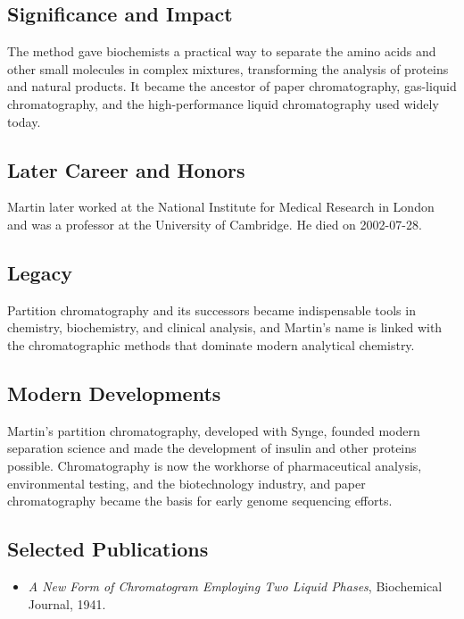 \subsection*{Significance and Impact}

The method gave biochemists a practical way to separate the amino acids and other small molecules in complex mixtures, transforming the analysis of proteins and natural products. It became the ancestor of paper chromatography, gas-liquid chromatography, and the high-performance liquid chromatography used widely today.

\subsection*{Later Career and Honors}

Martin later worked at the National Institute for Medical Research in London and was a professor at the University of Cambridge. He died on 2002-07-28.

\subsection*{Legacy}

Partition chromatography and its successors became indispensable tools in chemistry, biochemistry, and clinical analysis, and Martin's name is linked with the chromatographic methods that dominate modern analytical chemistry.

\subsection*{Modern Developments}

Martin's partition chromatography, developed with Synge, founded modern separation science and made the development of insulin and other proteins possible. Chromatography is now the workhorse of pharmaceutical analysis, environmental testing, and the biotechnology industry, and paper chromatography became the basis for early genome sequencing efforts.

\subsection*{Selected Publications}

\begin{itemize}

\item \emph{A New Form of Chromatogram Employing Two Liquid Phases}, Biochemical Journal, 1941.

\end{itemize}

